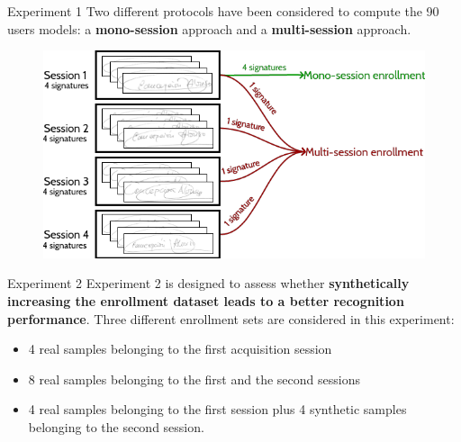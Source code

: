 \documentclass{beamer}
\begin{document}
\begin{frame}{Experiment 1}
Two different protocols have been considered to compute the 90 users models: a \textbf{mono-session} approach and a \textbf{multi-session} approach.
\begin{figure}[!htb]
\centering
\includegraphics[height=0.7\textheight]{multi-and-mono}

\label{fig:multiandmono}
\end{figure}


\end{frame}

\begin{frame}{Experiment 2}
Experiment 2 is designed to assess whether \textbf{synthetically increasing the enrollment dataset leads to a better recognition performance}. Three different enrollment sets are considered in this experiment: 
\begin{itemize}
  \item 4 real samples belonging to the
  first acquisition session
  \item 8 real samples belonging to the first and
  the second sessions
  \item 4 real samples belonging
  to the first session plus 4 synthetic samples belonging
  to the second session.
\end{itemize}


\end{frame}
\end{document}
